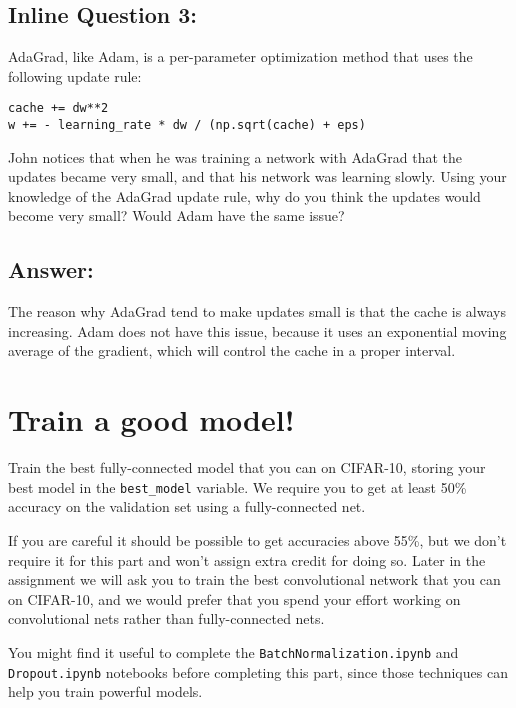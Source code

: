 \documentclass[11pt]{article}
\begin{document}
    \hypertarget{inline-question-3}{%
\subsection{Inline Question 3:}\label{inline-question-3}}

AdaGrad, like Adam, is a per-parameter optimization method that uses the
following update rule:

\begin{verbatim}
cache += dw**2
w += - learning_rate * dw / (np.sqrt(cache) + eps)
\end{verbatim}

John notices that when he was training a network with AdaGrad that the
updates became very small, and that his network was learning slowly.
Using your knowledge of the AdaGrad update rule, why do you think the
updates would become very small? Would Adam have the same issue?

\hypertarget{answer}{%
\subsection{Answer:}\label{answer}}

The reason why AdaGrad tend to make updates small is that the cache is
always increasing. Adam does not have this issue, because it uses an
exponential moving average of the gradient, which will control the cache
in a proper interval.

    \hypertarget{train-a-good-model}{%
\section{Train a good model!}\label{train-a-good-model}}

Train the best fully-connected model that you can on CIFAR-10, storing
your best model in the \texttt{best\_model} variable. We require you to
get at least 50\% accuracy on the validation set using a fully-connected
net.

If you are careful it should be possible to get accuracies above 55\%,
but we don't require it for this part and won't assign extra credit for
doing so. Later in the assignment we will ask you to train the best
convolutional network that you can on CIFAR-10, and we would prefer that
you spend your effort working on convolutional nets rather than
fully-connected nets.

You might find it useful to complete the
\texttt{BatchNormalization.ipynb} and \texttt{Dropout.ipynb} notebooks
before completing this part, since those techniques can help you train
powerful models.
\end{document}
